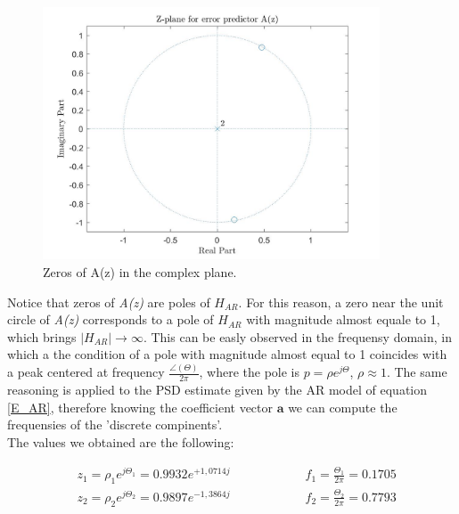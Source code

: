 \documentclass[a4paper,11pt,openright,twoside]{report}
\begin{document}
\begin{figure}[h!]
	\centering
	\includegraphics[width=10cm]{images/zplane_Az.jpg}
	\caption{Zeros of A(z) in the complex plane.}\label{Az}
\end{figure}	

\clearpage
Notice that zeros of \textit{A(z)} are poles of $H_{AR}$. For this reason, a zero near the unit circle of \textit{A(z)} corresponds to a pole of $H_{AR}$ with magnitude almost equale to 1, which brings $|H_{AR}|\rightarrow \infty$. This can be easly observed in the frequensy domain, in which a the condition of a pole with magnitude almost equal to 1 coincides with a peak centered at frequency $\frac{\angle(\Theta)}{2\pi}$, where the pole is $p=\rho e^{j\Theta}$, $\rho \approx 1$. The same reasoning is applied to the PSD estimate given by the AR model of equation \ref{E_AR}, therefore knowing the coefficient vector $\mathbf{a}$ we can compute the frequensies of the 'discrete compinents'. \\
The values we obtained are the following:

\begin{equation*}
\begin{split}
& z_1 = \rho_1 e^{j\Theta_1} = 0.9932e^{+1,0714j} \quad \quad \quad \quad \quad \quad  f_1= \frac{\Theta_1}{2\pi} = 0.1705\\
& z_2 = \rho_2 e^{j\Theta_2} = 0.9897e^{-1,3864j} \quad \quad \quad \quad \quad \quad  f_2= \frac{\Theta_2}{2\pi} = 0.7793
\end{split}
\end{equation*}
\end{document}
